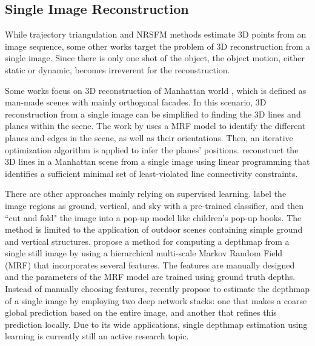 \subsection{Single Image Reconstruction}
While trajectory triangulation and NRSFM methods estimate 3D points from an image sequence, some other works target the problem of 3D reconstruction from a single image. Since there is only one shot of the object, the object motion, either static or dynamic, becomes irreverent for the reconstruction. 

Some works focus on 3D reconstruction of Manhattan world \cite{Coughlan_ICCV99}, which is defined as
man-made scenes with mainly orthogonal facades. In this scenario, 3D reconstruction from a single image can be simplified to finding the 3D lines and planes within the scene. The work by \citet{Delage_ISRR2005} uses a MRF model to identify the different planes and edges in the scene, as well as their orientations. Then, an iterative optimization algorithm is applied to infer the planes' positions. \citet{Ram_ICCV2013} reconstruct the 3D lines in a Manhattan scene from a single image using linear programming that identifies a sufficient minimal set of least-violated line connectivity constraints.

There are other approaches mainly relying on supervised learning. \citet{Hoiem_CGRAPH2005} label the image regions as ground, vertical, and sky with a pre-trained classifier, and then ``cut and fold" the image into a pop-up model like children's pop-up books. The method is limited to the application of outdoor scenes containing simple ground and vertical structures. \citet{Saxena_IJCV2008} propose a method for computing a depthmap from a single still image by using a hierarchical multi-scale Markov Random Field (MRF) that incorporates several features. The features are manually designed and the parameters of the MRF model are trained using ground truth depths. Instead of manually choosing features, \citet{eigen2014depth} recently propose to estimate the depthmap of a single image by employing two deep network stacks: one that makes a coarse global prediction based on the entire image, and another that refines this prediction locally. Due to its wide applications, single depthmap estimation using learning is currently still an active research topic.



















